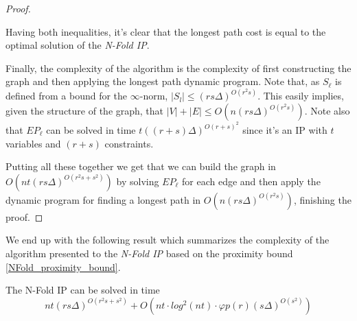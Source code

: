 \begin{proof}
\begin{center}
\end{center}

Having both inequalities, it's clear that the longest path cost is equal to the optimal solution of the \emph{N-Fold IP}. 

Finally, the complexity of the algorithm is the complexity of first constructing the graph and then applying the longest path dynamic program. Note that, as $S_\ell$ is defined from a bound for the $\infty$-norm, $|S_l| \leq (rs\Delta)^{O(r^2s)}$. This easily implies, given the structure of the graph, that $|V| + |E| \leq O(n(rs\Delta)^{O(r^2s)})$. Note also that $EP_\ell$ can be solved in time $t((r + s)\Delta)^{O(r + s)^2}$ since it's an IP with $t$ variables and $(r+s)$ constraints. 

Putting all these together we get that we can build the graph in $O(nt(rs\Delta)^{O(r^2s + s^2)})$ by solving $EP_\ell$ for each edge and then apply the dynamic program for finding a longest path in $O(n(rs\Delta)^{O(r^2s)})$, finishing the proof.
\end{proof}

We end up with the following result which summarizes the complexity of the algorithm presented to the \emph{N-Fold IP} based on the proximity bound \ref{NFold_proximity_bound}.
\begin{theorem}
    The N-Fold IP can be solved in time 
    \begin{equation*}
        nt(rs\Delta)^{O(r^2s + s^2)} + O(nt \cdot log^2(nt) \cdot \varphi p(r) (s\Delta)^{O(s^2)})
    \end{equation*}
\end{theorem}